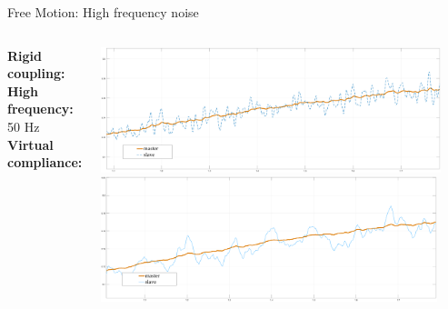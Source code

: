 \documentclass[10pt]{beamer}
\begin{document}
\begin{frame}{Free Motion: High frequency noise}
\smallskip
\begin{columns}
\color{Orange}\textbf{Rigid coupling:}\\
\bigskip
\bigskip
\bigskip
\color{black}\textbf{High frequency:} 50 Hz\\
\bigskip
\bigskip
\bigskip
\color{LightBlue}\textbf{Virtual compliance:}\\


\includegraphics[width=\textwidth,
height=0.45\textwidth]{../reportTeleop/Images/rCoupFree50htznoise}\\
\smallskip
\includegraphics[width=\textwidth,
height=0.45\textwidth]{../reportTeleop/Images/set20freePart50Htznoise}
\end{columns}


\end{frame}
\end{document}
